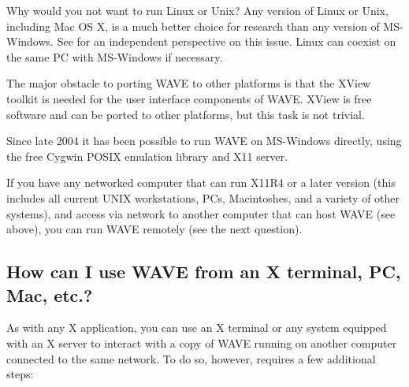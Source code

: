 \documentclass[twoside]{book}
\newcommand{\WAVE}{{\sf WAVE}\xspace}
\begin{document}
Why would you not want to run Linux or Unix?  Any version of Linux or Unix,
including Mac OS X, is a
much better choice for research than any version of MS-Windows. See
for an independent perspective on this issue.  Linux can coexist on the same PC
with MS-Windows if necessary.

The major obstacle to porting \WAVE{} to other platforms is that the XView
toolkit is needed for the user interface components of \WAVE{}.  XView is free
software and can be ported to other platforms, but this task is not trivial.

Since late 2004 it has been possible to run \WAVE{} on MS-Windows directly,
using the free Cygwin POSIX emulation library and X11 server.

If you have any networked computer that can run X11R4 or a later version
(this includes all current UNIX workstations, PCs, Macintoshes, and a variety
of other systems), and access via network to another computer that can host
\WAVE{} (see above), you can run \WAVE{} remotely (see the next question).

\subsection{How can I use \WAVE{} from an X terminal, PC, Mac, etc.?}

As with any X application, you can use an X terminal or any system equipped
with an X server to interact with a copy of \WAVE{} running on another computer
connected to the same network.  To do so, however, requires a few additional
steps:
\end{document}
